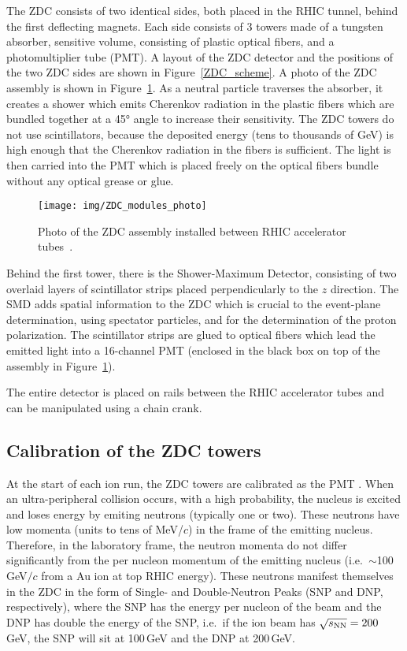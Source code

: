 The ZDC consists of two identical sides, both placed in the RHIC tunnel, behind 
the first deflecting magnets. Each side consists of 3 towers made of a tungsten absorber, sensitive volume, consisting of plastic optical fibers, and a photomultiplier tube (PMT)\@. A layout of the ZDC detector and the positions of the two ZDC sides are shown in Figure~\ref{ZDC_scheme}\@. A photo of the ZDC assembly is shown in Figure~\ref{ZDC_photo}\@. As a neutral particle traverses the absorber, it creates a shower which emits Cherenkov radiation in the plastic fibers which are bundled together at a 45° angle to increase their sensitivity. The ZDC towers do not use scintillators, because the deposited energy (tens to thousands of GeV) is high enough that the Cherenkov radiation in the fibers is sufficient. The light is then carried into the PMT which is placed freely on the optical fibers bundle without any optical grease or glue.

\begin{figure}[!htb]
\begin{center}
  \texttt{[image: img/ZDC\_modules\_photo]}
\end{center}
\caption{\label{ZDC_photo}Photo of the ZDC assembly installed between RHIC accelerator tubes~\cite{ZDCSMD}. }
\end{figure}

Behind the first tower, there is the Shower-Maximum Detector, consisting of two overlaid layers of scintillator strips placed perpendicularly to the $z$ direction. The SMD adds spatial information to the ZDC which is crucial to the event-plane determination, using spectator particles, and for the determination of the proton polarization\@. The scintillator strips are glued to optical fibers which lead the emitted light into a 16-channel PMT (enclosed in the black box on top of the assembly in Figure~\ref{ZDC_photo})\@.

The entire detector is placed on rails between the RHIC accelerator tubes and can be manipulated using a chain crank.

\subsection{Calibration of the ZDC towers\label{ZDCcalibration}}
At the start of each ion run, the ZDC towers are calibrated as the PMT . When an ultra-peripheral
collision occurs, with a high probability, the nucleus is excited and loses energy by emiting neutrons
(typically one or two). These neutrons have low momenta (units to tens of MeV/$c$) in the frame of the emitting nucleus. Therefore, in the laboratory frame, the neutron momenta do not differ significantly from the per nucleon momentum of the emitting nucleus (i.e.\ $\sim$100$\,$GeV$/c$ from a Au ion at top RHIC energy). These neutrons manifest themselves in the ZDC in the form of Single- and Double-Neutron Peaks
(SNP and DNP, respectively),
where the SNP has the energy per nucleon of the beam and the DNP has double the energy of the SNP, i.e.\ if
the ion beam has $\sqrt{s_\text{NN}} = 200\,$GeV, the SNP will sit at 100$\,$GeV and the DNP at 200$\,$GeV\@.


